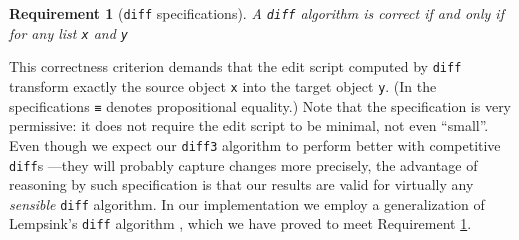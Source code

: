 \documentclass{sigplanconf}
\theoremstyle{plain}
\newtheorem{prop}{Proposition}
\newtheorem{req}{Requirement}
\begin{document}
\begin{req}[\texttt{diff} specifications]
  \label{req:diff-specs}
  A \texttt{diff} algorithm is correct if and only if for any list
  \texttt{x} and \texttt{y} 
\end{req}
%
This correctness criterion demands that the edit script computed by
\texttt{diff} transform exactly the source object \texttt{x} into the
target object \texttt{y}.  (In the specifications \texttt{≡} denotes
propositional equality.)
%
Note that the specification is very permissive: it does not require 
the edit script to be minimal, not even ``small''.
%
Even though we expect our \texttt{diff3} algorithm to perform better
with competitive \texttt{diff}s ---they will probably capture changes
more precisely, the advantage of reasoning by such specification is
that our results are valid for virtually any \emph{sensible}
\texttt{diff} algorithm.
%
In our implementation we employ a generalization of Lempsink's
\texttt{diff} algorithm \cite{Lemp09}, which we have proved to meet
Requirement \ref{req:diff-specs}.
\end{document}
